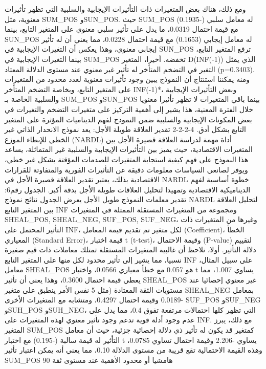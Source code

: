 \documentclass[12pt,a4paper]{report}
\begin{document}
ومع ذلك، هناك بعض المتغيرات ذات التأثيرات الإيجابية والسلبية التي تظهر تأثيرات معنوية، مثل SUM_POS وSUN_POS. حيث SUM_POS له معامل سلبي (-0.1935) مع قيمة احتمال 0.0319، ما يدل على تأثير سلبي معنوي على المتغير التابع، بينما SUN_POS له معامل إيجابي (0.1653) مع قيمة احتمال 0.0228، مما يعني أن له تأثير إيجابي معنوي، وهذا يعكس أن التغيرات الإيجابية في SUN_POS ترفع المتغير التابع، بينما التغيرات الإيجابية في SUM_POS تخفضه.
أخيرا، المتغير D(INF(-1)) الذي يمثل التغير في التضخم المتأخر له تأثير غير معنوي عند مستوى الدلالة المعتاد (p=0.3403).
ومنه يمكننا استنتاج أن النموذج يبين وجود تأثيرات معنوية لعدد محدود من المتغيرات على المتغير التابع، وبخاصة التضخم المتأخر INF(-1)*، وبعض التأثيرات الإيجابية والسلبية الخاصة بـ SUM_POS وSUN_POS بينما باقي المتغيرات لا تظهر تأثيرا معنويا خلال الفترة المعنية، هذا يشير إلى أهمية التركيز على متغيرات التضخم والتغيرات في بعض المكونات الإيجابية والسلبية ضمن النموذج لفهم الديناميات المؤثرة على المتغير التابع بشكل أدق.
4-2-2-2  تقدير العلاقة طويلة الأجل:
يعد نموذج الانحدار الذاتي غير الخطي للإبطاء الموزع (NARDL) أداة مهمة لدراسة العلاقة قصيرة الأجل بين المتغيرات الاقتصادية، حيث يميز بين التأثيرات الإيجابية والسلبية غير المتماثلة، يساعد هذا النموذج على فهم كيفية استجابة المتغيرات للصدمات المؤقتة بشكل غير خطي، ويوفر لصانعي السياسات معلومات دقيقة عن التأثيرات الفورية والمتفاوتة للقرارات الاقتصادية بذلك، يعتبر تقدير العلاقة قصيرة الأجل في NARDL خطوة أساسية لفهم الديناميكية الاقتصادية وتمهيدا لتحليل العلاقات طويلة الأجل بدقة أكبر.
الجدول رقم6: تقدير معلمات النموذج طويل الأجل
يعرض الجدول نتائج نموذج NARDL لتحليل العلاقة بين المتغير التابع INF ومجموعة من المتغيرات المستقلة الممثلة في المتغيرات SHEAL_POS, SHEAL_NEG, SUF_POS, SUF_NEG، وغيرها من المتغيرات ذات التأثير المحتمل على INF، لكل متغير تم تقديم قيمة المعامل (Coefficient)، الخطأ المعياري (Standard Error)، قيمة اختبار t (t-test)، وقيمة الاحتمال (P-value) لتقييم دلالة التأثير.
أولا، نلاحظ أن غالبية المتغيرات المستقلة تمتلك معاملات ذات قيم صغيرة نسبيا، مما يشير إلى تأثير محدود لكل منها على المتغير التابع INF على سبيل المثال، معامل SHEAL_POS هو 0.057 مع خطأ معياري 0.0566، واختبار t يساوي 1.007، مما يعطي قيمة احتمال 0.3600، وهذا يعني أن تأثير SHEAL_POS غير معنوي إحصائيا عند مستويات الثقة المعتادة (مثل 5%
نفس الأمر ينطبق على متغير SHEAL_NEG بمعامل -0.0189 وقيمة احتمال 0.4297، ومتشابه مع المتغيرات الأخرى SUF_POS وSUF_NEG وSUH_POS وSUH_NEG، التي تظهر كلها احتمالات مرتفعة تفوق 0.4، مما يدل على عدم وجود أدلة قوية تدعم وجود تأثير معنوي لهذه المتغيرات على INF.
مع ذلك، يبرز المتغير SUM_POS كمتغير قد يكون له تأثير ذي دلالة إحصائية جزئية، حيث أن معامل التأثير له قيمة سالبة (-0.195) مع اختبار t يساوي -2.206 وقيمة احتمال تساوي 0.0785، وهذه القيمة الاحتمالية تقع قريبة من مستوى الدلالة 0.10، مما يعني أنه يمكن اعتبار تأثير SUM_POS هامشيا أو محدود الأهمية عند مستوى ثقة 90%
\end{document}
